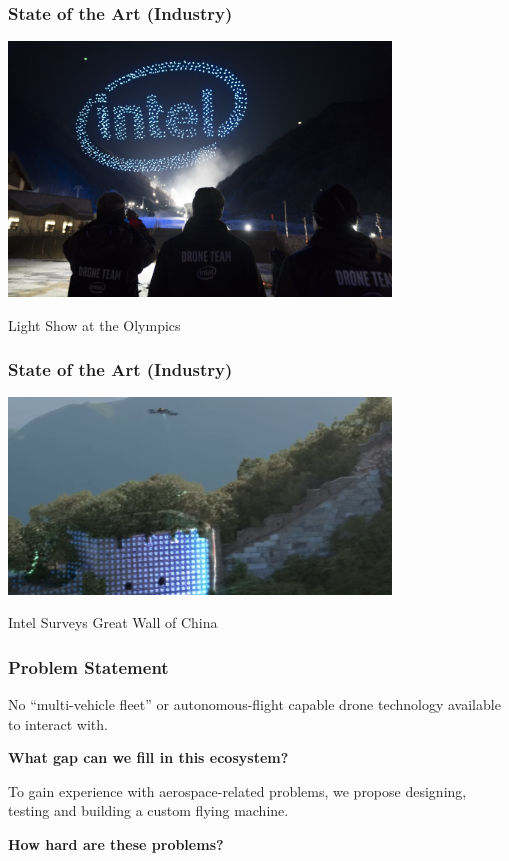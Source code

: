 \documentclass{beamer}
\begin{document}
\begin{frame}
\frametitle{State of the Art (Industry)}
\begin{center}
\includegraphics[width=4in]{../src/im/autonomous2}

Light Show at the Olympics
\end{center}
\end{frame}

\begin{frame}
\frametitle{State of the Art (Industry)}
\begin{center}
\includegraphics[width=4in]{../src/im/great_wall1}

Intel Surveys Great Wall of China
\end{center}
\end{frame}

\begin{frame}
\frametitle{Problem Statement}
\Large
No ``multi-vehicle fleet'' or autonomous-flight capable drone
technology available to interact with.
\break

\textbf{What gap can we fill in this ecosystem?}
\break

To gain experience with aerospace-related problems, we propose
designing, testing and building a custom flying machine.
\break

\textbf{How hard are these problems?}
\end{frame}
\end{document}
